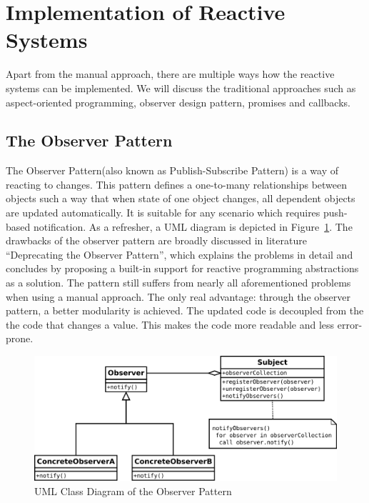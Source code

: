 \section {Implementation of Reactive Systems}
Apart from the manual approach, there are multiple ways how the reactive systems can be implemented. We will discuss the traditional approaches such as aspect-oriented programming, observer design pattern, promises and callbacks. 
	
\subsection{The Observer Pattern}
The Observer Pattern(also known as Publish-Subscribe Pattern)\cite{understandingObserverPattern} is a way of reacting to changes. 
This pattern defines a one-to-many relationships between objects such a way that when state of one object changes, all dependent objects are updated automatically. 
It is suitable for any scenario which requires push-based notification\cite{understandingObserverPattern}. 
As a refresher, a UML diagram is depicted in Figure~\ref{fig:observer_uml}. The drawbacks of the observer pattern are broadly discussed in literature  ``Deprecating the Observer Pattern'', which explains the problems in detail and concludes by proposing a built-in support for reactive programming abstractions as a solution\cite{deprecatingTheObserverPattern}. 
The pattern still suffers from nearly all aforementioned problems when using a manual approach. 
The only real advantage: through the observer pattern, a better modularity is achieved. 
The updated code is decoupled from the the code that changes a value. 
This makes the code more readable and less error-prone. 

\begin{figure}[!h]
	\centering
	\includegraphics[scale=0.5,trim=0 0 0 0]{images/observer_uml.png}
	\caption{UML Class Diagram of the Observer Pattern}
	\label{fig:observer_uml}
\end{figure}


